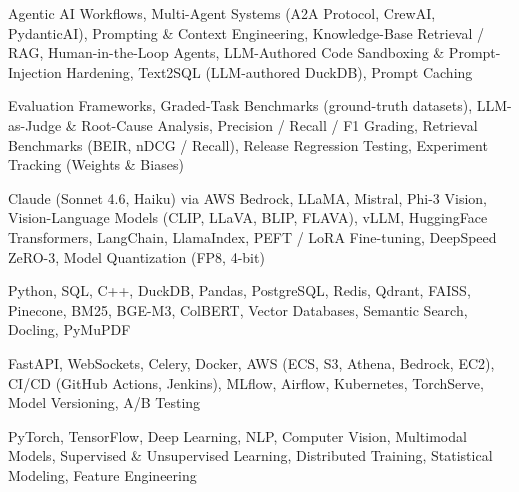 \documentclass[letter,10pt]{article}
\begin{document}
 Agentic AI Workflows, Multi-Agent Systems (A2A Protocol, CrewAI, PydanticAI), Prompting \& Context Engineering, Knowledge-Base Retrieval / RAG, Human-in-the-Loop Agents, LLM-Authored Code Sandboxing \& Prompt-Injection Hardening, Text2SQL (LLM-authored DuckDB), Prompt Caching\par\vspace{2pt}

 Evaluation Frameworks, Graded-Task Benchmarks (ground-truth datasets), LLM-as-Judge \& Root-Cause Analysis, Precision / Recall / F1 Grading, Retrieval Benchmarks (BEIR, nDCG / Recall), Release Regression Testing, Experiment Tracking (Weights \& Biases)\par\vspace{2pt}

 Claude (Sonnet 4.6, Haiku) via AWS Bedrock, LLaMA, Mistral, Phi-3 Vision, Vision-Language Models (CLIP, LLaVA, BLIP, FLAVA), vLLM, HuggingFace Transformers, LangChain, LlamaIndex, PEFT / LoRA Fine-tuning, DeepSpeed ZeRO-3, Model Quantization (FP8, 4-bit)\par\vspace{2pt}

 Python, SQL, C++, DuckDB, Pandas, PostgreSQL, Redis, Qdrant, FAISS, Pinecone, BM25, BGE-M3, ColBERT, Vector Databases, Semantic Search, Docling, PyMuPDF\par\vspace{2pt}

 FastAPI, WebSockets, Celery, Docker, AWS (ECS, S3, Athena, Bedrock, EC2), CI/CD (GitHub Actions, Jenkins), MLflow, Airflow, Kubernetes, TorchServe, Model Versioning, A/B Testing\par\vspace{2pt}

 PyTorch, TensorFlow, Deep Learning, NLP, Computer Vision, Multimodal Models, Supervised \& Unsupervised Learning, Distributed Training, Statistical Modeling, Feature Engineering
\end{document}
